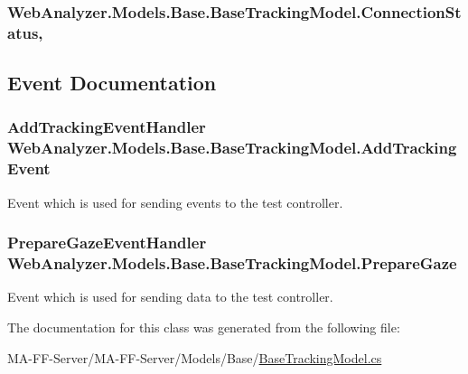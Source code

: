 \subsubsection[{Connection\+Status}]{ Web\+Analyzer.\+Models.\+Base.\+Base\+Tracking\+Model.\+Connection\+Status\hspace{0.3cm}{\ttfamily [get]}, {\ttfamily [set]}}\label{class_web_analyzer_1_1_models_1_1_base_1_1_base_tracking_model_aea243d67939ea7e2e62adbdecc525026}


\subsection{Event Documentation}
\hypertarget{class_web_analyzer_1_1_models_1_1_base_1_1_base_tracking_model_a3c003ad3cd3902810994f53409a6aeb7}{}
\subsubsection[{Add\+Tracking\+Event}]{\setlength{\rightskip}{0pt plus 5cm}Add\+Tracking\+Event\+Handler Web\+Analyzer.\+Models.\+Base.\+Base\+Tracking\+Model.\+Add\+Tracking\+Event}\label{class_web_analyzer_1_1_models_1_1_base_1_1_base_tracking_model_a3c003ad3cd3902810994f53409a6aeb7}


Event which is used for sending events to the test controller. 

\hypertarget{class_web_analyzer_1_1_models_1_1_base_1_1_base_tracking_model_acf17194aca2875e9f69c15772af39417}{}
\subsubsection[{Prepare\+Gaze}]{\setlength{\rightskip}{0pt plus 5cm}Prepare\+Gaze\+Event\+Handler Web\+Analyzer.\+Models.\+Base.\+Base\+Tracking\+Model.\+Prepare\+Gaze}\label{class_web_analyzer_1_1_models_1_1_base_1_1_base_tracking_model_acf17194aca2875e9f69c15772af39417}


Event which is used for sending data to the test controller. 



The documentation for this class was generated from the following file\+:\begin{DoxyCompactItemize}
\item 
M\+A-\/\+F\+F-\/\+Server/\+M\+A-\/\+F\+F-\/\+Server/\+Models/\+Base/\hyperlink{_base_tracking_model_8cs}{Base\+Tracking\+Model.\+cs}\end{DoxyCompactItemize}
